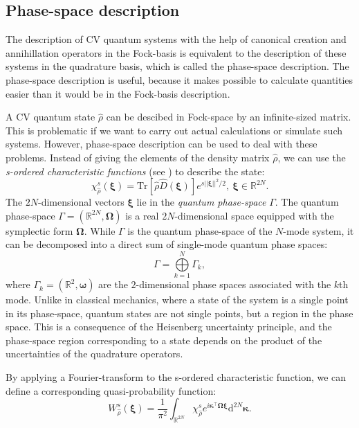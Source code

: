 \documentclass[12pt, a4paper,  nobibnotes]{article}
\newcommand{\op}[1]{\hat{#1}}
\newcommand{\dd}{\mathrm{d}}
\newcommand{\Tr}[1]{\mathrm{Tr}\left[#1\right]}
\begin{document}
\subsection{Phase-space description}
\label{sec:phasespace}
The description of CV quantum systems with the help of canonical creation and annihillation operators in 
the Fock-basis is equivalent to the description of these systems in the quadrature basis, 
which is called the phase-space description. The phase-space description is useful, 
because it makes possible to calculate quantities easier than it would be in the Fock-basis description.

A CV quantum state $\op\rho$ can be descibed in Fock-space by an infinite-sized matrix. This is 
problematic if we want to carry out actual calculations or simulate such systems. However, 
phase-space description can be used to deal with these problems. Instead of giving the elements
of the density matrix $\op\rho$, we can use the \textit{s-ordered characteristic functions} 
(see \cite{Adesso2014}) to describe the state:
\begin{equation}
    \chi_{\op \rho}^s(\pmb\xi) = \Tr{\op\rho\op D(\pmb\xi)}e^{s||\pmb\xi||^2/2},~\pmb\xi\in\mathbb R^{2N}.
\end{equation}
The $2N$-dimensional vectors $\pmb\xi$ lie in the \textit{quantum phase-space} $\Gamma$. The 
quantum phase-space $\Gamma=(\mathbb R^{2N}, \pmb\Omega)$ is a real $2N$-dimensional space 
equipped with the symplectic form $\pmb\Omega$. While $\Gamma$ is the quantum phase-space of the 
$N$-mode system, it can be decomposed into a direct sum of single-mode quantum phase spaces:
\begin{equation}
    \Gamma = \bigoplus\limits_{k=1}^N\Gamma_k,
\end{equation}
where $\Gamma_k=(\mathbb R^2, \pmb\omega)$ are the $2$-dimensional phase spaces associated with 
the $k$th mode. Unlike in classical mechanics, where a state of the system is a single point 
in its phase-space, quantum states are not single points, but a region in the phase space. This 
is a consequence of the Heisenberg uncertainty principle, and the phase-space region 
corresponding to a state depends on the product of the uncertainties of the 
quadrature operators.
\par
By applying a Fourier-transform to the s-ordered characteristic function, we 
can define a corresponding quasi-probability function:
\begin{equation}
    W_{\op\rho}^s(\pmb\xi) = \frac{1}{\pi^2}\int_{\mathbb R^{2N}}\chi_{\op\rho}^s
    e^{i\pmb\kappa^\top\pmb\Omega\pmb\xi} \dd^{2N}\pmb\kappa.
\end{equation}
\end{document}
